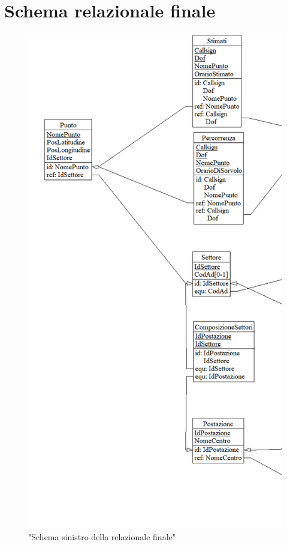 \section{Schema relazionale finale}
\begin{figure}[H]
  \centering
  \includegraphics[height=1\textheight]{figures/Capture1.PNG}
  \caption{"Schema sinistro della relazionale finale"}
\end{figure}
